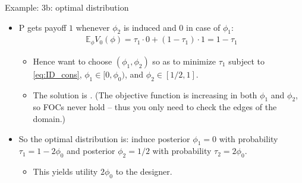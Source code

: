 \documentclass[english,10pt
,aspectratio=169
]{beamer}
\begin{document}
\begin{frame}{Example: 3b: optimal distribution}
	\begin{itemize}
		\item P gets payoff $1$ whenever $\phi_2$ is induced and $0$ in case of $\phi_1$:
		\vspace{-0.5em}\begin{align*}
			\mathbb{E}_\phi V_0 (\phi) = \tau_1 \cdot 0 + (1-\tau_1) \cdot 1 = 1-\tau_1
		\end{align*}\vspace{-1.5em}
		\begin{itemize}
			\item Hence want to choose $(\phi_1,\phi_2)$ so as to minimize $\tau_1$ subject to \eqref{eq:ID_cons}, $\phi_1 \in [0, \phi_0)$, and $\phi_2 \in [1/2, 1]$.
			\item The solution is . (The objective function is increasing in both $\phi_1$ and $\phi_2$, so FOCs never hold -- thus you only need to check the edges of the domain.)
		\end{itemize}
	
		\item So \alert{the optimal distribution is}: induce posterior $\phi_1 = 0$ with probability $\tau_1 = 1-2\phi_0$ and posterior $\phi_2 = 1/2$ with probability $\tau_2 = 2 \phi_0$.
		\begin{itemize}
			\item This yields utility $2 \phi_0$ to the designer.
		\end{itemize}
	\end{itemize}
\end{frame}
\end{document}

